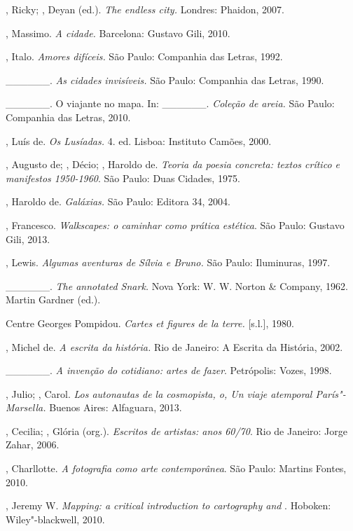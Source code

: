 \begin{Parskip}
, Ricky; , Deyan (ed.). \emph{The endless city.} Londres:
Phaidon, 2007.

, Massimo. \emph{A cidade.} Barcelona: Gustavo Gili, 2010.

, Italo. \emph{Amores difíceis.} São Paulo: Companhia das
Letras, 1992.

\_\_\_\_\_\_. \emph{As cidades invisíveis.} São Paulo: Companhia
das Letras, 1990.

\_\_\_\_\_\_. O viajante no mapa. In: \_\_\_\_\_\_.
\emph{Coleção de areia.} São Paulo: Companhia das Letras, 2010.

, Luís de. \emph{Os Lusíadas.} 4. ed. Lisboa: Instituto Camões,
2000.

, Augusto de; , Décio; , Haroldo de. \emph{Teoria da poesia concreta: textos crítico e manifestos 1950-1960}. São Paulo:
Duas Cidades, 1975.

, Haroldo de. \emph{Galáxias.} São Paulo: Editora 34, 2004.

, Francesco. \emph{Walkscapes: o caminhar como prática
estética}. São Paulo: Gustavo Gili, 2013.

, Lewis. \emph{Algumas aventuras de Sílvia e Bruno.} São Paulo:
Iluminuras, 1997.

\_\_\_\_\_\_. \emph{The annotated Snark.} Nova York: W. W. Norton
\& Company, 1962. Martin Gardner (ed.).

Centre Georges Pompidou. \emph{Cartes et figures de la terre.}
{[}s.l.{]}, 1980.

, Michel de. \emph{A escrita da história.} Rio de Janeiro: A
Escrita da História, 2002. %

\_\_\_\_\_\_. \emph{A invenção do cotidiano: artes de fazer}.
Petrópolis: Vozes, 1998.

, Julio; , Carol. \emph{Los autonautas de la cosmopista,
o, Un viaje atemporal París"-Marsella.} Buenos Aires: Alfaguara, 2013.

, Cecilia; , Glória (org.). \emph{Escritos de artistas:
anos 60/70}. Rio de Janeiro: Jorge Zahar, 2006.

, Charllotte. \emph{A fotografia como arte contemporânea}. São
Paulo: Martins Fontes, 2010.

, Jeremy W. \emph{Mapping: a critical introduction to
cartography and }. Hoboken: Wiley"-blackwell, 2010.


\end{Parskip}
